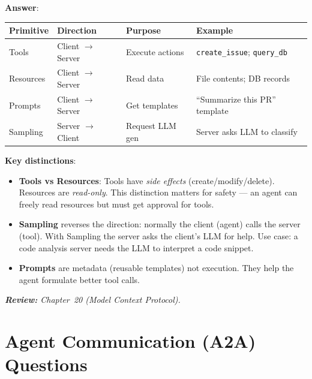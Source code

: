 \begin{questionbox}
\textbf{Answer}:

\begin{tabular}{@{}lp{3.5cm}p{3.5cm}p{6cm}@{}}
\toprule
\textbf{Primitive} & \textbf{Direction} & \textbf{Purpose} & \textbf{Example} \\
\midrule
Tools & Client $\to$ Server & Execute actions & \texttt{create\_issue}; \texttt{query\_db} \\
Resources & Client $\to$ Server & Read data & File contents; DB records \\
Prompts & Client $\to$ Server & Get templates & ``Summarize this PR'' template \\
Sampling & Server $\to$ Client & Request LLM gen & Server asks LLM to classify \\
\bottomrule
\end{tabular}

\textbf{Key distinctions}:

\begin{itemize}
  \item \textbf{Tools vs Resources}: Tools have \emph{side effects} (create/modify/delete). Resources are \emph{read-only}. This distinction matters for safety --- an agent can freely read resources but must get approval for tools.
  \item \textbf{Sampling} reverses the direction: normally the client (agent) calls the server (tool). With Sampling the server asks the client’s LLM for help. Use case: a code analysis server needs the LLM to interpret a code snippet.
  \item \textbf{Prompts} are metadata (reusable templates) not execution. They help the agent formulate better tool calls.
\end{itemize}

\emph{\textbf{Review:} Chapter~20 (Model Context Protocol).}
\end{questionbox}

\section{Agent Communication (A2A) Questions}
\label{agent-communication-a2a-questions}

